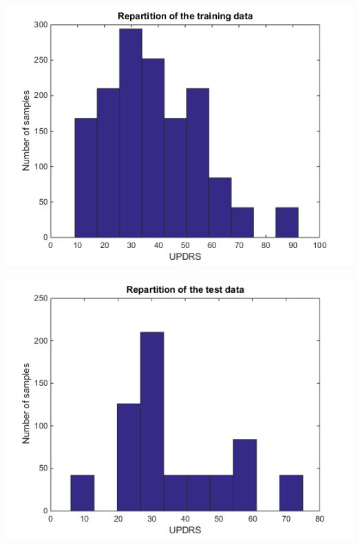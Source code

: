 \documentclass{report}
\begin{document}
	\begin{center}
		\begin{minipage}{.40\linewidth}
			\includegraphics[scale=0.42]{ressources/db1}
		\end{minipage}
		\hspace*{1.5cm}
		\begin{minipage}{.40\linewidth}
			\includegraphics[scale=0.42]{ressources/db2}
		\end{minipage}
		\hspace*{0.6cm}
	\end{center}
	\vspace{1cm}
	
\end{document}
